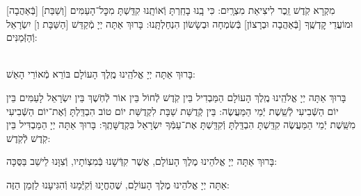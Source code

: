 \documentclass[twoside, openany, parskip=half, 11pt]{book}
\begin{document}
[בְּֿאַהֲבָה] מִקְרָא קֹֽדֶשׁ זֵֽכֶר לִיצִיאַת מִצְרָֽיִם: כִּי בָֽנוּ בָחַֽרְתָּ וְֿאוֹתָֽנוּ קִדַּֽשְׁתָּ מִכׇּל־הָעַמִּים [וְשַׁבַּת] וּמוֹעֲדֵי קׇדְשֶֽׁךָ [בְּֿאַהֲבָה וּבְרָצוֹן] בְּֿשִׂמְחָה וּבְשָׂשׂוֹן הִנְחַלְתָּֽנוּ: בָּרוּךְ אַתָּה יְיָ מְֿקַדֵּשׁ [הַשַּׁבָּת וְ] יִשְׂרָאֵל וְֿהַזְּֿמַנִּים:

\begin{sometimes}

\\
בָּרוּךְ אַתָּה יְיָ אֱלֹהֵֽינוּ מֶֽלֶךְ הָעוֹלָם בּוֹרֵא מְֿאוֹרֵי הָאֵשׁ:

בָּרוּךְ אַתָּה יְיָ אֱלֹהֵֽינוּ מֶֽלֶךְ הָעוֹלָם הַמַּבְדִיל בֵּין קֹֽדֶשׁ לְֿחוֹל בֵּין אוֹר לְֿחֹֽשֶׁךְ בֵּין יִשְׂרָאֵל לָעַמִּים בֵּין יוֹם הַשְּֿׁבִיעִי לְֿשֵֽׁשֶׁת יְֿמֵי הַמַּעֲשֶׂה: בֵּין קְֿדֻשַּׁת שַׁבָּת לִקְדֻשַּׁת יוֹם טוֹב הִבְדַּֽלְתָּ וְֿאֶת־יוֹם הַשְּֿׁבִיעִי מִשֵּֽׁשֶׁת יְֿמֵי הַמַּעֲשֶׂה קִדַּֽשְׁתָּ הִבְדַּֽלְתָּ וְֿקִדַּֽשְׁתָּ אֶת־עַמְּֿךָ יִשְׂרָאֵל בִּקְדֻשָּׁתֶֽךָ: בָּרוּךְ אַתָּה יְיָ הַמַּבְדִּיל בֵּין קֹֽדֶשׁ לְֿקֹֽדֶשׁ:

\end{sometimes}



\vspace{-.5\baselineskip}
בָּרוּךְ אַתָּה יְיָ אֱלֹהֵינוּ מֶלֶךְ הָעוֹלָם, אֲשֶׁר קִדְּֿשָׁנוּ בְּֿמִצְוֹתָיו, וְֿצִוָּנוּ לֵישֵׁב בַּסֻּכָּה:

 אַתָּה יְיָ אֱלֹהֵינוּ מֶלֶךְ הָעוֹלָם, שֶׁהֶחֱיָנוּ וְֿקִיְּֿֿמָנוּ וְֿהִגִּיעָנוּ לַזְמַן הַזֶּה:
\end{document}
